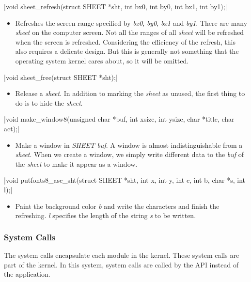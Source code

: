 \documentclass{swfcthesis}
\begin{document}
\csingle|void sheet_refresh(struct SHEET *sht, int bx0, int by0, int bx1, int by1);|
\begin{itemize}
\item Refreshes the screen range specified by \emph{bx0}, \emph{by0}, \emph{bx1} and
  \emph{by1}. There are many \emph{sheet} on the computer screen. Not all the ranges of
  all \emph{sheet} will be refreshed when the screen is refreshed. Considering the
  efficiency of the refresh, this also requires a delicate design. But this is generally
  not something that the operating system kernel cares about, so it will be omitted.
\end{itemize}

\csingle|void sheet_free(struct SHEET *sht);|
\begin{itemize}
\item Release a \emph{sheet}. In addition to marking the \emph{sheet} as unused, the first
  thing to do is to hide the \emph{sheet}. 
\end{itemize}

\csingle|void make_window8(unsigned char *buf, int xsize, int ysize, char *title, char act);|
\begin{itemize}
\item Make a window in \emph{SHEET} \emph{buf}. A window is almost indistinguishable from
  a \emph{sheet}. When we create a window, we simply write different data to the
  \emph{buf} of the \emph{sheet} to make it appear as a window.
  
\end{itemize}

\csingle|void putfonts8_asc_sht(struct SHEET *sht, int x, int y, int c, int b, char *s, int l);|
\begin{itemize}
\item Paint the background color \emph{b} and write the characters and finish the
  refreshing. \emph{l} specifies the length of the string \emph{s} to be written.
    
\end{itemize}

\subsubsection{System Calls}
\label{sec:system-call}

The system calls encapsulate each module in the kernel. These system calls are part of the
kernel. In this system, system calls are called by the API instead of the
application.
\end{document}
